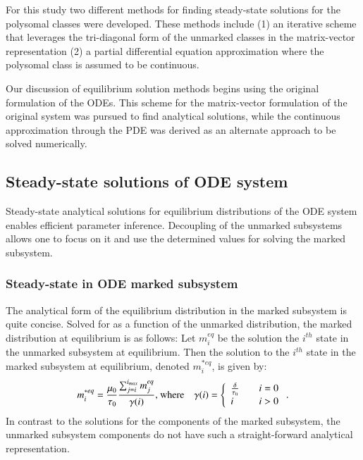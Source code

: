 \documentclass[review]{elsarticle}
\begin{document}
For this study two different methods for finding steady-state solutions for the polysomal classes were developed.
These methods include (1) an iterative scheme that leverages the tri-diagonal form of the unmarked classes in the matrix-vector representation (2) a partial differential equation approximation where the polysomal class is assumed to be continuous.  

Our discussion of equilibrium solution methods begins using the original formulation of the ODEs.
This scheme for the matrix-vector formulation of the original system was pursued to find analytical solutions, while the continuous approximation through the PDE was derived as an alternate approach to be solved numerically.  %

\subsection{Steady-state solutions of ODE system}
Steady-state analytical solutions for equilibrium distributions of the ODE system enables efficient parameter inference.
Decoupling of the unmarked subsystems allows one to focus on it and use the determined values for solving the marked subsystem.  
\subsubsection{Steady-state in ODE marked subsystem}
The analytical form of the equilibrium distribution in the marked subsystem is quite concise.
Solved for as a function of the unmarked distribution, the marked distribution at equilibrium is as follows:
Let $m_{i}^{eq}$ be the solution the $i^{th}$ state in the unmarked subsystem at equilibrium.
Then the solution to the $i^{th}$ state in the marked subsystem at equilibrium, denoted $m_{i}^{* eq}$, is given by:
\begin{equation}\label{eq:anyl_marked_eq}
m_{i}^{* eq} = \frac{\mu_0}{\tau_0}\frac{\sum_{j=i}^{i_{max}}m_{j}^{eq}}{\gamma (i)} \text{, where\quad}
\gamma (i) = \left\{
        \begin{array}{ll}
            \frac{\delta}{\tau_0} & \quad i = 0 \\
            i & \quad i > 0
        \end{array}
    \right. .
\end{equation} 
In contrast to the solutions for the components of the marked subsystem, the unmarked subsystem components do not have such a straight-forward analytical representation.
\end{document}
